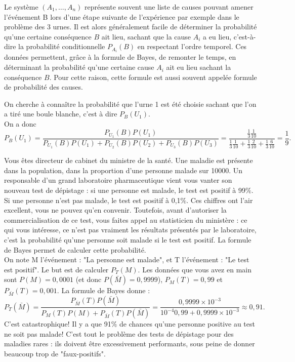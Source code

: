 \documentclass{book}
\begin{document}
\begin{Remarque}
Le système $(A_1,\ldots,A_n)$ représente souvent une liste de causes pouvant amener l'événement B lors d'une étape
suivante de l'expérience par exemple dans le problème des 3 urnes. Il est alors généralement facile de déterminer la probabilité qu'une certaine
conséquence $B$ ait lieu, sachant que la cause $A_i$ a eu lieu, c'est-à-dire la probabilité conditionnelle
$P_{A_i}(B)$ en respectant l'ordre temporel. Ces données permettent, grâce à la formule de
Bayes, de remonter le temps, en déterminant la probabilité qu'une certaine cause $A_i$ ait eu lieu sachant
la conséquence $B$. Pour cette raison, cette formule est aussi souvent appelée formule de probabilité des
causes.
\end{Remarque}
\begin{Exemple}[3 urnes]
On cherche à connaître la probabilité que l'urne 1 est été choisie sachant que l'on a tiré une boule blanche, c'est à dire $P_B(U_1)$.\\
On a donc 
$$ P_B(U_1) = \frac{ P_{U_1}(B)P(U_1) }{  P_{U_1}(B)P(U_1)+ P_{U_2}(B)P(U_2)+ P_{U_3}(B)P(U_3) }=\frac{\frac{1}{3}\frac{1}{10}}{\frac{1}{3}\frac{1}{10}+\frac{1}{3}\frac{2}{10}+\frac{1}{3}\frac{6}{10}}=\frac{1}{9}.$$
\end{Exemple}


\begin{Exemple}
Vous êtes directeur de cabinet du ministre de la santé. Une maladie est présente dans la population, dans la proportion d'une personne malade sur 10000. Un responsable d'un grand laboratoire pharmaceutique vient vous vanter son nouveau test de dépistage : si une personne est malade, le test est positif à 99$\%$. Si une personne n'est pas malade, le test est positif à 0,1$\%$.
  Ces chiffres ont l'air excellent, vous ne pouvez qu'en convenir. Toutefois, avant d'autoriser la commercialisation de ce test, vous faites appel au statisticien du ministère : ce qui vous intéresse, ce n'est pas vraiment les résultats présentés par le laboratoire, c'est la probabilité qu'une personne soit malade si le test est positif. La formule de Bayes permet de calculer cette probabilité.\\
  On note M l'événement : "La personne est malade", et T l'événement : "Le test est positif". Le but est de calculer $P_T(M)$. Les données que vous avez en main sont $P(M)=0,0001$ (et donc $P(\bar M)=0,9999$), $P_M(T)=0,99$ et $P_{\bar M}(T)=0,001$. La formule de Bayes donne :
$$P_T( \bar M)=\frac{P_{\bar M}(T)P(\bar M)}{P_M(T)P(M)+P_{\bar M}(T)P(\bar M)}=\frac{0,9999×10^{-3}}{10^{-4}0,99+0,9999×10^{-3}}\approx 0,91.$$
C'est catastrophique! Il y a que 91$\%$ de chances qu'une personne positive au test ne soit pas malade! C'est tout le problème des tests de dépistage pour des maladies rares : ils doivent être excessivement performants, sous peine de donner beaucoup trop de "faux-positifs".
\end{Exemple}
\end{document}
